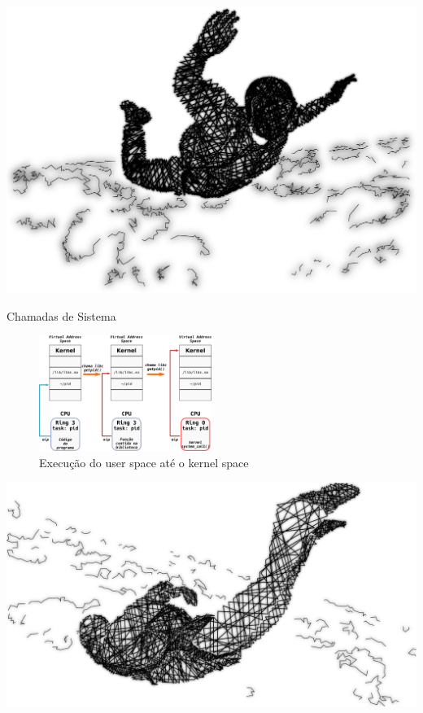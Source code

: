 \documentclass[xcolor={usenames,svgnames,dvipsnames},brazil,english,12pt,aspectratio=149]{beamer}
\begin{document}
\begin{frame}[plain]
  \includegraphics[width=\textwidth]{presentation_sec_three}
\end{frame}

\begin{frame}{Chamadas de Sistema}
	\begin{figure}[!h]
		\centering
		\includegraphics[width=0.5\textwidth]{userspace_to_kernel} 
		\caption{Execução do user space até o kernel space}
		\label{fig:userspace_kernelspace}
	\end{figure}
\end{frame}

\begin{frame}[plain]
  \includegraphics[width=\textwidth]{presentation_sec_four}
\end{frame}
\end{document}
